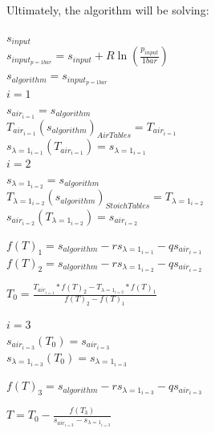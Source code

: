 \documentclass[titlepage]{article}
\begin{document}
    Ultimately, the algorithm will be solving:
    \begin{center}
        
        $s_{input}$ \\
        $s_{input_{p=1 bar}} = s_{input} + R \ln \left( \frac{p_{input}}{1 bar} \right)$ \\
        $s_{algorithm} = s_{input_{p=1 bar}}$ \\

        \vspace*{0.5cm}
        $i = 1$ \\
        $s_{air_{i=1}} = s_{algorithm}$ \\
        $T_{air_{i=1}}(s_{algorithm})_{Air Tables} = T_{air_{i=1}}$ \\
        $s_{\lambda=1_{i=1}}(T_{air_{i=1}}) = s_{\lambda =1_{i=1}}$ \\

        \vspace*{0.5cm}
        $i = 2$ \\
        $s_{\lambda =1_{i=2}} = s_{algorithm}$ \\
        $T_{\lambda =1_{i=2}}(s_{algorithm})_{Stoich Tables} = T_{\lambda =1_{i=2}}$ \\
        $s_{air_{i=2}}(T_{\lambda =1_{i=2}}) = s_{air_{i=2}}$ \\

        \vspace*{0.5cm}

        $f(T)_{1} = s_{algorithm} - r s_{\lambda=1_{i=1}} - q s_{air_{i=1}}$ \\
        $f(T)_{2} = s_{algorithm} - r s_{\lambda=1_{i=2}} - q s_{air_{i=2}}$ \\

        \vspace*{0.5cm}

        $T_{0} = \frac{T_{air_{i=1}} * f(T)_{2} - T_{\lambda=1_{i=2}} * f(T)_{1}}{f(T)_{2} - f(T)_{1}}$ \\

        \vspace*{0.5cm}

        $i= 3$ \\
        $s_{air_{i=3}}(T_{0}) = s_{air_{i=3}}$ \\
        $s_{\lambda=1_{i=3}}(T_{0}) = s_{\lambda=1_{i=3}}$ \\

        \vspace*{0.5cm}

        $f(T)_{3} = s_{algorithm} - r s_{\lambda=1_{i=3}} - q s_{air_{i=3}}$ \\

        \vspace*{0.5cm}

        $T = T_{0}  - \frac{f(T_{3})}{s_{air_{i=3}} - s_{\lambda=1_{i=3}}}$ \\ 
    \end{center}
\end{document}
